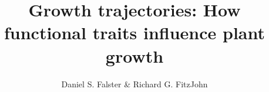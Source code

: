 
\usepackage[rgb,dvipsnames]{xcolor}

\newcommand{\smurl}[1]{\url{#1}}
\newcommand{\ud}{\ensuremath{\rm{d}}}
\newcommand{\tabitem}{~~\llap{\textbullet}~~}
\newcommand{\email}[1]{\href{mailto:#1}{\texttt{#1}}}
\newcommand{\plant}{\texttt{plant}}
\newcommand{\wplcp}{\textsc{WPLCP}}



\title{Growth trajectories: How functional traits influence plant growth}

\author{Daniel S. Falster\textsuperscript{\textasteriskcentered} \& Richard G. FitzJohn}

\usepackage{natbib}

\usepackage{etoolbox}


\usepackage{graphicx}
\graphicspath{{../output/}}

\let\Oldincludegraphics\includegraphics
\renewcommand{\includegraphics}[1]{\Oldincludegraphics[width=15cm,height=21cm,keepaspectratio]{#1}}
